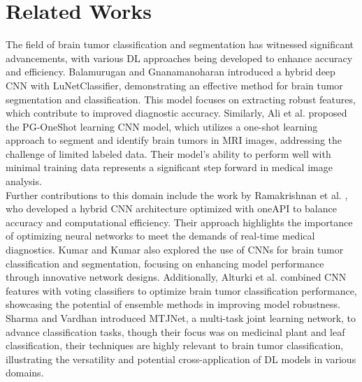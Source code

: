 \section{Related Works}
\label{sec2}
The field of brain tumor classification and segmentation has witnessed significant advancements, with various DL approaches being developed to enhance accuracy and efficiency. Balamurugan and Gnanamanoharan \cite{balamurugan2023brain} introduced a hybrid deep CNN with LuNetClassifier, demonstrating an effective method for brain tumor segmentation and classification. This model focuses on extracting robust features, which contribute to improved diagnostic accuracy. Similarly, Ali et al. \cite{ali2024segmentation} proposed the PG-OneShot learning CNN model, which utilizes a one-shot learning approach to segment and identify brain tumors in MRI images, addressing the challenge of limited labeled data. Their model's ability to perform well with minimal training data represents a significant step forward in medical image analysis.\\
Further contributions to this domain include the work by Ramakrishnan et al. \cite{ramakrishnan2024optimizing}, who developed a hybrid CNN architecture optimized with oneAPI to balance accuracy and computational efficiency. Their approach highlights the importance of optimizing neural networks to meet the demands of real-time medical diagnostics. Kumar and Kumar \cite{kumar2023human} also explored the use of CNNs for brain tumor classification and segmentation, focusing on enhancing model performance through innovative network designs. Additionally, Alturki et al. \cite{alturki2023combining} combined CNN features with voting classifiers to optimize brain tumor classification performance, showcasing the potential of ensemble methods in improving model robustness. Sharma and Vardhan \cite{sharma2024mtjnet} introduced MTJNet, a multi-task joint learning network, to advance classification tasks, though their focus was on medicinal plant and leaf classification, their techniques are highly relevant to brain tumor classification, illustrating the versatility and potential cross-application of DL models in various domains. \\
